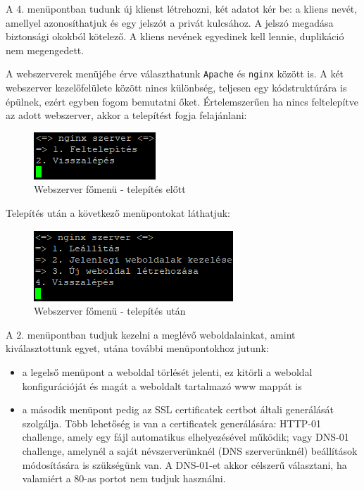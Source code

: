 A 4. menüpontban tudunk új klienst létrehozni, két adatot kér be: a kliens nevét, amellyel azonosíthatjuk és egy jelszót a privát kulcsához. A jelszó megadása biztonsági okokból kötelező. A kliens nevének egyedinek kell lennie, duplikáció nem megengedett.

\pagebreak

A webszerverek menüjébe érve választhatunk \texttt{Apache} és \texttt{nginx} között is. A két webszerver kezelőfelülete között nincs különbség, teljesen egy kódstruktúrára is épülnek, ezért egyben fogom bemutatni őket. Értelemszerűen ha nincs feltelepítve az adott webszerver, akkor a telepítést fogja felajánlani:

\begin{figure}[h]
\centering
\includegraphics[scale=1]{images/web_before_install.png}
\caption{Webszerver főmenü - telepítés előtt}
\end{figure}

Telepítés után a következő menüpontokat láthatjuk:

\begin{figure}[h]
\centering
\includegraphics[scale=1]{images/web_after_install.png}
\caption{Webszerver főmenü - telepítés után}
\end{figure}

A 2. menüpontban tudjuk kezelni a meglévő weboldalainkat, amint kiválasztottunk egyet, utána további menüpontokhoz jutunk:

\begin{itemize}
	\item a legelső menüpont a weboldal törlését jelenti, ez kitörli a weboldal konfigurációját és magát a weboldalt tartalmazó www mappát is
	\item a második menüpont pedig az SSL certificatek certbot általi generálását szolgálja. 
	Több lehetőség is van a certificatek generálására: HTTP-01 challenge, amely egy fájl automatikus elhelyezésével működik; vagy DNS-01 challenge, amelynél a saját névszerverünknél (DNS szerverünknél) beállítások módosítására is szükségünk van. A DNS-01-et akkor célszerű választani, ha valamiért a 80-as portot nem tudjuk használni.
\end{itemize}

